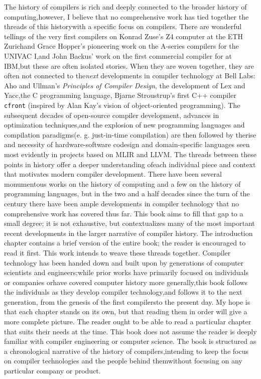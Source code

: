 
The history of compilers is rich and deeply connected to the broader history of 
computing,however, I believe that no comprehensive work has tied together the 
threads of this historywith a specific focus on compilers. There are wonderful 
tellings of the very first compilers on Konrad Zuse's Z4 computer at the ETH 
Zurichand Grace Hopper's pioneering work on the A-series compilers for the 
UNIVAC I,and John Backus' work on the first commercial compiler for \FTN{}
 at IBM,but these are often isolated stories. When they are woven together, they 
are often not connected to the\textit{next}
 developments in compiler technology at Bell Labs: Aho and Ullman's 
\textit{Principles of Compiler Design}, the development of Lex and Yacc,the C 
programming language, Bjarne Stroustrup's first C++ compiler \texttt{cfront}
(inspired by Alan Kay's vision of object-oriented programming). The subsequent 
decades of open-source compiler development, advances in optimization 
techniques,and the explosion of new programming languages and compilation 
paradigms(e. g. just-in-time compilation) are then followed by therise and 
necessity of hardware-software codesign and domain-specific languages seen most 
evidently in projects based on MLIR and LLVM. The threads between these points 
in history offer a deeper understanding ofeach individual piece and context 
that motivates modern compiler development. There have been several 
monumentous works on the history of computing and a few on the history of 
programming languages, but in the two and a half decades since the turn of the 
century there have been ample developments in compiler technology that no 
comprehensive work has covered thus far. This book aims to fill that gap to a 
small degree; it is not exhaustive, but contextualizes many of the most 
important recent developments in the larger narrative of compiler history.
The introduction chapter contains a brief version of the entire book; the 
reader is encouraged to read it first. This work intends to weave these threads 
together. Compiler technology has been handed down and built upon by generations 
of computer scientists and engineers;while prior works have primarily focused 
on individuals or companies orhave covered computer history more generally,this 
book follows the individuals as they develop compiler technology,and follows it 
to the next generation, from the genesis of the first compilersto the present 
day. My hope is that each chapter stands on its own, but that reading them in 
order will give a more complete picture. The reader ought to be able to read a 
particular chapter that suits their needs at the time. This book does not assume 
the reader is deeply familiar with compiler engineering or computer science. The 
book is structured as a chronological narrative of the history of 
compilers,intending to keep the focus on compiler technologies and the people 
behind themwithout focusing on any particular company or product.
